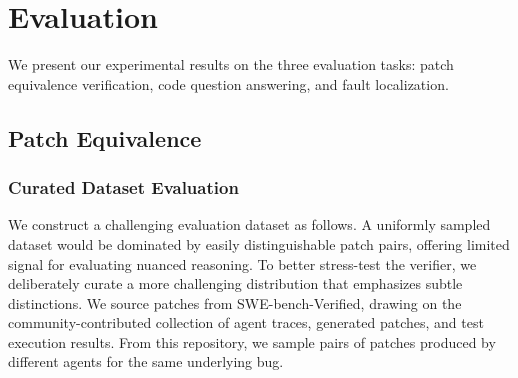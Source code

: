 \documentclass[]{meta}
\newcommand{\satish}[1]{\textcolor{purple}{{\it [SC: #1]}}}
\begin{document}


\section{Evaluation}

We present our experimental results on the three evaluation tasks: patch equivalence verification, code question answering, and fault localization.

\subsection{Patch Equivalence}

\subsubsection{Curated Dataset Evaluation}
We construct a challenging evaluation dataset as follows. A uniformly sampled dataset would be dominated by easily distinguishable patch pairs, offering limited signal for evaluating nuanced reasoning. To better stress-test the verifier, we deliberately curate a more challenging distribution that emphasizes subtle distinctions. We source patches from SWE-bench-Verified, drawing on the community-contributed collection of agent traces, generated patches, and test execution results. From this repository, we sample pairs of patches produced by different agents for the same underlying bug.
\end{document}
